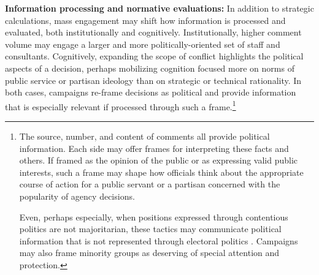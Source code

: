 \textbf{Information processing and normative evaluations:} 
In addition to strategic calculations, mass engagement may shift how information is processed and evaluated, both institutionally and cognitively.
Institutionally, higher comment volume may engage a larger and more politically-oriented set of staff and consultants. Cognitively, expanding the scope of conflict highlights the political aspects of a decision, perhaps mobilizing cognition focused more on norms of public service or partisan ideology than on strategic or technical rationality. In both cases, campaigns re-frame decisions as political and provide information that is especially relevant if processed through such a frame.\footnote{
The source, number, and content of comments all provide political information. Each side may offer frames for interpreting these facts and others. If 
framed as the opinion of the public or as expressing valid public interests, such a frame may shape how officials think about the appropriate course of action for a public servant or a partisan concerned with the popularity of agency decisions.  

Even, perhaps especially, when positions expressed through contentious politics
are not majoritarian, these tactics may communicate political information that is not represented through electoral politics \citep{Gillion2012, Gillion2013}. 
Campaigns may also frame minority groups as deserving of special attention and protection.
}
